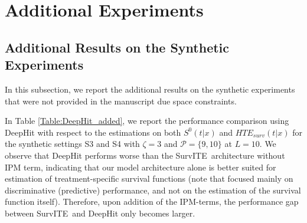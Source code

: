 \documentclass{article}
\newcommand{\proposed}{{SurvITE}}
\begin{document}
\section{Additional Experiments}
\newnumbering 








\subsection{Additional Results on the Synthetic Experiments}
In this subsection, we report the additional results on the synthetic experiments that were not provided in the manuscript due space constraints. 

{
In Table \ref{Table:DeepHit_added}, we report the performance comparison using DeepHit with respect to the estimations on both $S^{0}(t|x)$ and $HTE_{surv}(t|x)$ for the synthetic settings S3 and S4 with $\zeta=3$ and $\mathcal{P}=\{9,10\}$ at $L=10$.  
We observe that DeepHit performs worse than the \proposed~architecture without IPM term, indicating that our model architecture alone is better suited for estimation of treatment-specific survival functions (note that \cite{Changhee:AAAI18} focused mainly on discriminative (predictive) performance, and not on the estimation of the survival function itself). Therefore, upon addition of the IPM-terms, the performance gap between \proposed~and DeepHit only becomes larger.}
\end{document}
